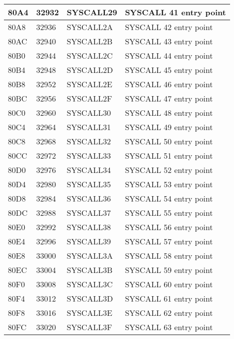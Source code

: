 \begin{longtable}{|L{1.2cm}|L{1.1cm}|C{2cm}|L{6cm}|}
\hline
\small  80A4 & \small 32932 & SYSCALL29 & SYSCALL 41 entry point \\
\hline
\small  80A8 & \small 32936 & SYSCALL2A & SYSCALL 42 entry point \\
\hline
\small  80AC & \small 32940 & SYSCALL2B & SYSCALL 43 entry point \\
\hline
\small  80B0 & \small 32944 & SYSCALL2C & SYSCALL 44 entry point \\
\hline
\small  80B4 & \small 32948 & SYSCALL2D & SYSCALL 45 entry point \\
\hline
\small  80B8 & \small 32952 & SYSCALL2E & SYSCALL 46 entry point \\
\hline
\small  80BC & \small 32956 & SYSCALL2F & SYSCALL 47 entry point \\
\hline
\small  80C0 & \small 32960 & SYSCALL30 & SYSCALL 48 entry point \\
\hline
\small  80C4 & \small 32964 & SYSCALL31 & SYSCALL 49 entry point \\
\hline
\small  80C8 & \small 32968 & SYSCALL32 & SYSCALL 50 entry point \\
\hline
\small  80CC & \small 32972 & SYSCALL33 & SYSCALL 51 entry point \\
\hline
\small  80D0 & \small 32976 & SYSCALL34 & SYSCALL 52 entry point \\
\hline
\small  80D4 & \small 32980 & SYSCALL35 & SYSCALL 53 entry point \\
\hline
\small  80D8 & \small 32984 & SYSCALL36 & SYSCALL 54 entry point \\
\hline
\small  80DC & \small 32988 & SYSCALL37 & SYSCALL 55 entry point \\
\hline
\small  80E0 & \small 32992 & SYSCALL38 & SYSCALL 56 entry point \\
\hline
\small  80E4 & \small 32996 & SYSCALL39 & SYSCALL 57 entry point \\
\hline
\small  80E8 & \small 33000 & SYSCALL3A & SYSCALL 58 entry point \\
\hline
\small  80EC & \small 33004 & SYSCALL3B & SYSCALL 59 entry point \\
\hline
\small  80F0 & \small 33008 & SYSCALL3C & SYSCALL 60 entry point \\
\hline
\small  80F4 & \small 33012 & SYSCALL3D & SYSCALL 61 entry point \\
\hline
\small  80F8 & \small 33016 & SYSCALL3E & SYSCALL 62 entry point \\
\hline
\small  80FC & \small 33020 & SYSCALL3F & SYSCALL 63 entry point \\

\end{longtable}
